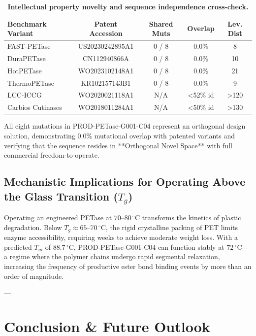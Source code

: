 \documentclass[10pt,twocolumn,a4paper]{article}
\begin{document}
\begin{table}[H]
\centering
\small
\caption{\textbf{Intellectual property novelty and sequence independence cross-check.}}
\label{tab:patent}
\begin{tabularx}{\columnwidth}{lcccc}
\toprule
\textbf{Benchmark Variant} & \textbf{Patent Accession} & \textbf{Shared Muts} & \textbf{Overlap} & \textbf{Lev. Dist} \\
\midrule
FAST-PETase~\cite{Lu2022} & US20230242895A1 & 0 / 8 & 0.0\% & 8 \\
DuraPETase~\cite{Cui2021} & CN112940866A & 0 / 8 & 0.0\% & 10 \\
HotPETase~\cite{Bell2022} & WO2023102148A1 & 0 / 8 & 0.0\% & 21 \\
ThermoPETase~\cite{Son2019} & KR102157143B1 & 0 / 8 & 0.0\% & 9 \\
LCC-ICCG~\cite{Tournier2020} & WO2020021118A1 & N/A & <52\% id & >120 \\
Carbios Cutinases & WO2018011284A1 & N/A & <50\% id & >130 \\
\bottomrule
\end{tabularx}
\end{table}

All eight mutations in PROD-PETase-G001-C04 represent an orthogonal design solution, demonstrating 0.0\% mutational overlap with patented variants and verifying that the sequence resides in **Orthogonal Novel Space** with full commercial freedom-to-operate.

\subsection{Mechanistic Implications for Operating Above the Glass Transition ($T_g$)}
Operating an engineered PETase at $70\text{--}80\,^\circ\text{C}$ transforms the kinetics of plastic degradation. Below $T_g \approx 65\text{--}70\,^\circ\text{C}$, the rigid crystalline packing of PET limits enzyme accessibility, requiring weeks to achieve moderate weight loss. With a predicted $T_m$ of $88.7\,^\circ\text{C}$, PROD-PETase-G001-C04 can function stably at $72\,^\circ\text{C}$—a regime where the polymer chains undergo rapid segmental relaxation, increasing the frequency of productive ester bond binding events by more than an order of magnitude.

---

\section{Conclusion \& Future Outlook}
\end{document}

